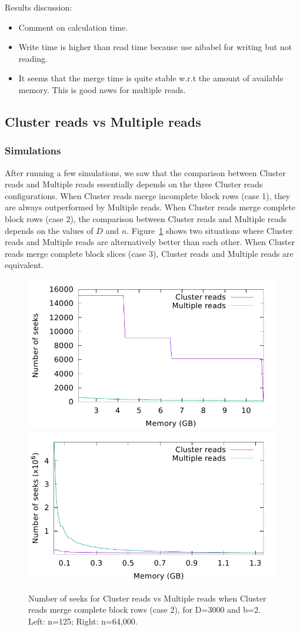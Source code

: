 \documentclass[10pt, conference, compsocconf]{IEEEtran}
\begin{document}
Results discussion:
\begin{itemize}
\item Comment on calculation time.
\item Write time is higher than read time because use nibabel for writing but not reading.
\item It seems that the merge time is quite stable w.r.t the amount of available memory. This is good news for multiple reads. 
\end{itemize}


\subsection{Cluster reads vs Multiple reads}

\subsubsection{Simulations}
After running a few simulations, we saw that the comparison between
Cluster reads and Multiple reads essentially depends on the three
Cluster reads configurations.  When Cluster reads merge incomplete
block rows (case 1), they are always outperformed by Multiple reads.
When Cluster reads merge complete block rows (case 2), the comparison
between Cluster reads and Multiple reads depends on the values of $D$
and $n$. Figure~\ref{fig:model-comparison} shows two situations where
Cluster reads and Multiple reads are alternatively better than each
other. When Cluster reads merge complete block slices (case 3),
Cluster reads and Multiple reads are equivalent.

\begin{figure}
  \includegraphics[width=0.45\columnwidth]{figures/model-big-brain.pdf}
  \includegraphics[width=0.45\columnwidth]{figures/model-big-brain-rescan.pdf}
  \caption{Number of seeks for Cluster reads vs Multiple reads when
    Cluster reads merge complete block rows (case 2), for D=3000 and
    b=2. Left: n=125; Right: n=64,000.}
  \label{fig:model-comparison}
\end{figure}
\end{document}
